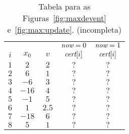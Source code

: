 \begin{table}[htb]
    \begin{tabular}{|c|c|c|c|c|}
        \hline
        &       &       & $\textit{now} = 0$ & $\textit{now} = 1$ \\
        $i$   & $x_0$ & $v$   & $\textit{cert}[i]$ & $\textit{cert}[i]$ \\
        \hline
        $1$   & $2$   & $2$   & $?$        & $?$        \\

        $2$   & $6$   & $1$   & $?$        & $?$        \\

        $3$   & $-6$  & $3$   & $?$        & $?$        \\

        $4$   & $-16$ & $4$   & $?$        & $?$        \\

        $5$   & $-1$  & $5$   & $?$        & $?$        \\

        $6$   & $1$   & $2.5$ & $?$        & $?$        \\

        $7$   & $-18$ & $6$   & $?$        & $?$        \\

        $8$   & $5$   & $1$   & $?$        & $?$        \\

        \hline
    \end{tabular}
    \caption{Tabela para as Figuras~\ref{fig:maxdevent}
    e~\ref{fig:max:update}. (incompleta)}\label{tab:table}
\end{table}